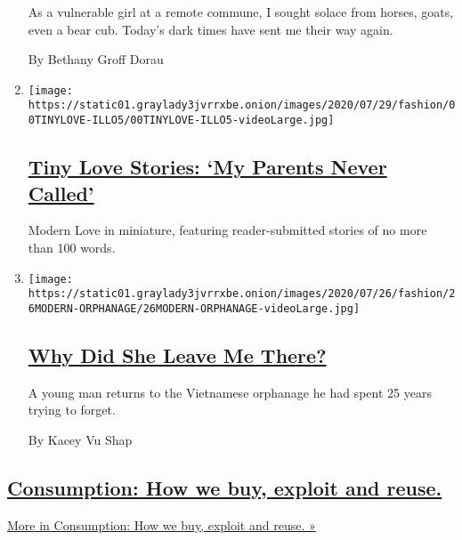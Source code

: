 \begin{enumerate}
  As a vulnerable girl at a remote commune, I sought solace from horses,
  goats, even a bear cub. Today's dark times have sent me their way
  again.

  By Bethany Groff Dorau
\item
  \texttt{[image: https://static01.graylady3jvrrxbe.onion/images/2020/07/29/fashion/00TINYLOVE-ILLO5/00TINYLOVE-ILLO5-videoLarge.jpg]}

  \hypertarget{tiny-love-stories-my-parents-never-called}{%
  \subsection{\texorpdfstring{\href{/2020/07/28/style/tiny-modern-love-stories-coronavirus-my-parents-never-called.html}{Tiny
  Love Stories: `My Parents Never
  Called'}}{Tiny Love Stories: `My Parents Never Called'}}\label{tiny-love-stories-my-parents-never-called}}

  Modern Love in miniature, featuring reader-submitted stories of no
  more than 100 words.
\item
  \texttt{[image: https://static01.graylady3jvrrxbe.onion/images/2020/07/26/fashion/26MODERN-ORPHANAGE/26MODERN-ORPHANAGE-videoLarge.jpg]}

  \hypertarget{why-did-she-leave-me-there}{%
  \subsection{\texorpdfstring{\href{/2020/07/24/style/modern-love-adoption-vietnam-why-did-she-leave-me-there.html}{Why
  Did She Leave Me
  There?}}{Why Did She Leave Me There?}}\label{why-did-she-leave-me-there}}

  A young man returns to the Vietnamese orphanage he had spent 25 years
  trying to forget.

  By Kacey Vu Shap
\end{enumerate}

\hypertarget{consumption-how-we-buy-exploit-and-reuse}{%
\subsection{\texorpdfstring{\href{/issue/fashion/2019/12/16/consumption}{Consumption:
How we buy, exploit and
reuse.}}{Consumption: How we buy, exploit and reuse.}}\label{consumption-how-we-buy-exploit-and-reuse}}

\href{/issue/fashion/2019/12/16/consumption}{More in Consumption: How we
buy, exploit and reuse. »}

